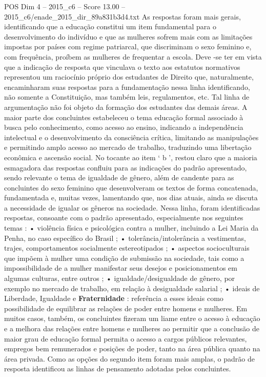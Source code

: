\begin{textsample}{POS Dim 4 – 2015\_c6 – Score 13.00 – 2015\_c6/enade\_2015\_dir\_89a831b3d4.txt}
As respostas foram mais gerais, identificando que a educação constitui um item fundamental para o desenvolvimento do indivíduo e que as mulheres sofrem mais com as limitações impostas por países com regime patriarcal, que discriminam o sexo feminino e, com frequência, proíbem as mulheres de frequentar a escola.
Deve -se ter em vista que a indicação de resposta que vinculava o texto aos estatutos normativos representou um raciocínio próprio dos estudantes de Direito que, naturalmente, encaminharam suas respostas para a fundamentação nessa linha identificando, não somente a Constituição, mas também leis, regulamentos, etc.
Tal linha de argumentação não foi objeto da formação dos estudantes das demais áreas.
A maior parte dos concluintes estabeleceu o tema educação formal associado à busca pelo conhecimento, como acesso ao ensino, indicando a independência intelectual e o desenvolvimento da consciência crítica, limitando as manipulações e permitindo amplo acesso ao mercado de trabalho, traduzindo uma libertação econômica e ascensão social.
No tocante ao item ‘ b ’, restou claro que a maioria esmagadora das respostas confluiu para as indicações do padrão apresentado, sendo relevante o tema de igualdade de gênero, além de candente para as concluintes do sexo feminino que desenvolveram os textos de forma concatenada, fundamentada e, muitas vezes, lamentando que, nos dias atuais, ainda se discuta a necessidade de igualar os gêneros na sociedade.
Nessa linha, foram identificadas respostas, consoante com o padrão apresentado, especialmente nos seguintes temas : • violência física e psicológica contra a mulher, incluindo a Lei Maria da Penha, no caso específico do Brasil ; • tolerância/intolerância a vestimentas, trajes, comportamentos socialmente estereotipados ; • aspectos socioculturais que impõem à mulher uma condição de submissão na sociedade, tais como a impossibilidade de a mulher manifestar seus desejos e posicionamentos em algumas culturas, entre outros ; • igualdade/desigualdade de gênero, por exemplo no mercado de trabalho, em relação à desigualdade salarial ; • ideais de Liberdade, Igualdade e \textbf{Fraternidade} : referência a esses ideais como possibilidade de equilibrar as relações de poder entre homens e mulheres.
Em muitos casos, também, os concluintes fizeram um liame entre o acesso à educação e a melhora das relações entre homens e mulheres ao permitir que a conclusão de maior grau de educação formal permita o acesso a cargos públicos relevantes, empregos bem remunerados e posições de poder, tanto na área pública quanto na área privada.
Como as opções do segundo item foram mais amplas, o padrão de resposta identificou as linhas de pensamento adotadas pelos concluintes.

\end{textsample}
